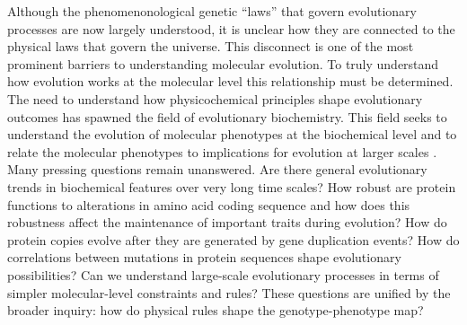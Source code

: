 Although the phenomenonological genetic ``laws'' that govern evolutionary
processes are now largely understood, it is unclear how they are connected
to the physical laws that govern the universe. This disconnect is
one of the most prominent barriers to understanding molecular evolution.
To truly understand how evolution works at the molecular level this
relationship must be determined. The need to understand how physicochemical
principles shape evolutionary outcomes has spawned the field of evolutionary
biochemistry. This field seeks to understand the evolution of molecular
phenotypes at the biochemical level and to relate the molecular phenotypes
to implications for evolution at larger scales \citep{feeney_evolutionary_1969,harms_evolutionary_2013,harms_analyzing_2010}.
Many pressing questions remain unanswered. Are there general evolutionary
trends in biochemical features over very long time scales? How robust
are protein functions to alterations in amino acid coding sequence
and how does this robustness affect the maintenance of important traits
during evolution? How do protein copies evolve after they are generated
by gene duplication events? How do correlations between mutations
in protein sequences shape evolutionary possibilities? Can we understand
large-scale evolutionary processes in terms of simpler molecular-level
constraints and rules? These questions are unified by the broader
inquiry: how do physical rules shape the genotype-phenotype map? 

